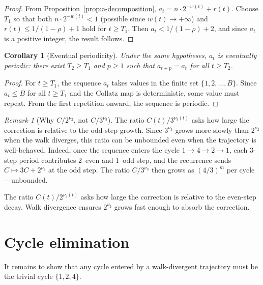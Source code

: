 \documentclass[manuscript]{aomart}
\theoremstyle{plain}
\newtheorem{corollary}[theorem]{Corollary}
\theoremstyle{definition}
\theoremstyle{remark}
\newtheorem{remark}[theorem]{Remark}
\numberwithin{equation}{section}
\begin{document}
\begin{proof}
From Proposition~\ref{prop:a-decomposition},
$a_t = n \cdot 2^{-w(t)} + r(t)$.  Choose $T_1$ so that both
$n \cdot 2^{-w(t)} < 1$ (possible since $w(t) \to +\infty$) and
$r(t) \le 1/(1-\rho) + 1$ hold for $t \ge T_1$.  Then
$a_t < 1/(1-\rho) + 2$, and since $a_t$ is a positive integer, the
result follows.
\end{proof}

\begin{corollary}[Eventual periodicity]\label{cor:periodic}
Under the same hypotheses, $a_t$ is eventually periodic: there exist
$T_2 \ge T_1$ and $p \ge 1$ such that $a_{t+p} = a_t$ for all
$t \ge T_2$.
\end{corollary}

\begin{proof}
For $t \ge T_1$, the sequence $a_t$ takes values in the finite set
$\{1, 2, \ldots, B\}$.  Since $a_t \le B$ for all $t \ge T_1$ and
the Collatz map is deterministic, some value must repeat.  From the
first repetition onward, the sequence is periodic.
\end{proof}

\begin{remark}[Why $C/2^{\nu_2}$, not $C/3^{\nu_3}$]
\label{rem:normalization}
The ratio $C(t)/3^{\nu_3(t)}$ asks how large the correction is
relative to the odd-step growth.  Since $3^{\nu_3}$ grows more slowly
than $2^{\nu_2}$ when the walk diverges, this ratio can be unbounded
even when the trajectory is well-behaved.  Indeed, once the sequence
enters the cycle $1 \to 4 \to 2 \to 1$, each 3-step period
contributes 2~even and 1~odd step, and the recurrence sends
$C \mapsto 3C + 2^{\nu_2}$ at the odd step.  The ratio
$C/3^{\nu_3}$ then grows as $(4/3)^m$ per cycle---unbounded.

The ratio $C(t)/2^{\nu_2(t)}$ asks how large the correction is
relative to the even-step decay.  Walk divergence ensures $2^{\nu_2}$
grows fast enough to absorb the correction.
\end{remark}

\section{Cycle elimination}\label{sec:cycles}

It remains to show that any cycle entered by a walk-divergent
trajectory must be the trivial cycle $\{1, 2, 4\}$.
\end{document}
